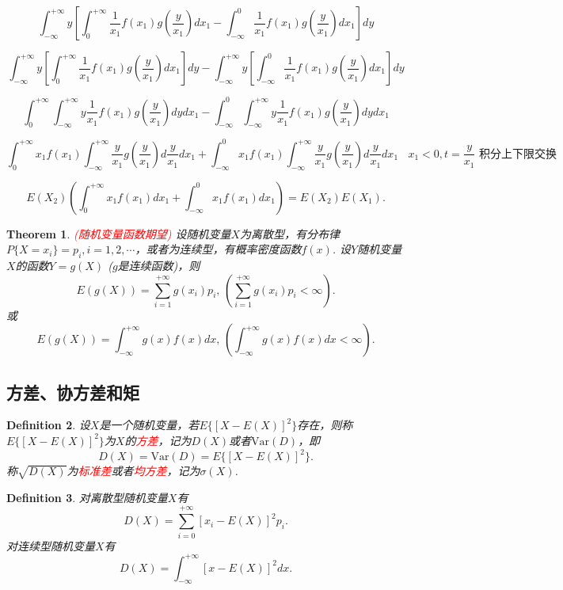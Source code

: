 \documentclass{article}
\newtheorem{theorem}{Theorem}[section]
\newtheorem{definition}[theorem]{Definition}
\newcommand{\redt}[1]{\textcolor{red}{#1}}
\begin{document}

$$
\int_{-\infty}^{+\infty}y \left[\int_0^{+\infty} \frac{1}{x_1}f(x_1)g(\frac{y}{x_1})dx_1 - \int_{-\infty}^0 \frac{1}{x_1}f(x_1)g(\frac{y}{x_1})dx_1 \right]dy
$$

$$
\int_{-\infty}^{+\infty}y \left[\int_0^{+\infty} \frac{1}{x_1}f(x_1)g(\frac{y}{x_1})dx_1\right]dy - \int_{-\infty}^{+\infty}y\left[\int_{-\infty}^0 \frac{1}{x_1}f(x_1)g(\frac{y}{x_1})dx_1 \right]dy
$$

$$
\int_0^{+\infty}\int_{-\infty}^{+\infty} y\frac{1}{x_1}f(x_1)g(\frac{y}{x_1})dydx_1 - \int_{-\infty}^0\int_{-\infty}^{+\infty} y\frac{1}{x_1}f(x_1)g(\frac{y}{x_1})dydx_1
$$

$$
\int_0^{+\infty}x_1f(x_1)\int_{-\infty}^{+\infty}\frac{y}{x_1}g(\frac{y}{x_1})d\frac{y}{x_1}dx_1 + \int_{-\infty}^0x_1f(x_1)\int_{-\infty}^{+\infty} \frac{y}{x_1}g(\frac{y}{x_1})d\frac{y}{x_1}dx_1 ~~~~ \text{$x_1 < 0, t=\frac{y}{x_1}$ 积分上下限交换}
$$

$$
E(X_2)\left(\int_0^{+\infty}x_1f(x_1)dx_1 +\int_{-\infty}^0x_1f(x_1)dx_1\right) = E(X_2)E(X_1).
$$


\begin{theorem}
\rm \redt{(随机变量函数期望)} 设随机变量$X$为离散型，有分布律$P\{X=x_i\}=p_i,i=1,2,\cdots$，或者为连续型，有概率密度函数$f(x)$. 设$Y$随机变量$X$的函数$Y=g(X)$ ($g$是连续函数)，则
$$
E(g(X))=\sum\limits_{i=1}^{+\infty}g(x_i)p_i,\,\left(\sum\limits_{i=1}^{+\infty}g(x_i)p_i < \infty \right) .
$$
或
$$
E(g(X)) = \int_{-\infty}^{+\infty}g(x)f(x)dx,\, \left(\int_{-\infty}^{+\infty}g(x)f(x)dx < \infty\right).
$$
\end{theorem}

\newpage
\subsection{方差、协方差和矩}

\begin{definition}
\rm 设$X$是一个随机变量，若$E\{\left[X-E(X)\right]^2\}$存在，则称$E\{\left[X-E(X)\right]^2\}$为$X$的\redt{方差}，记为$D(X)$或者$\text{Var}(D)$，即
$$
D(X) = \text{Var}(D) = E\{\left[X-E(X)\right]^2\}.
$$
称$\sqrt{D(X)}$为\redt{标准差}或者\redt{均方差}，记为$\sigma(X)$. 
\end{definition}

\begin{definition}
\rm  对离散型随机变量$X$有
$$
D(X) = \sum\limits_{i = 0}^{+\infty} \left[ x_i - E(X) \right]^2 p_i.
$$
对连续型随机变量$X$有
$$
D(X) = \int_{-\infty}^{+\infty}\left[x-E(X)\right]^2dx.
$$
\end{definition}
\end{document}
